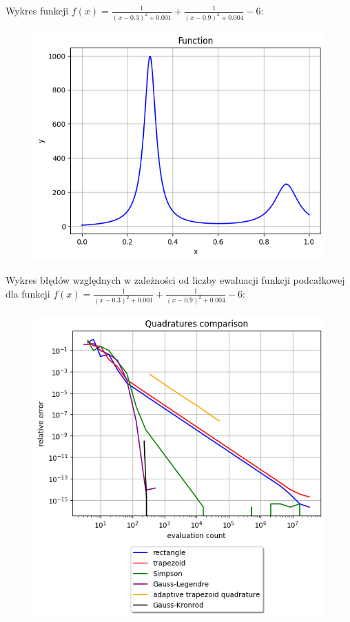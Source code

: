 \documentclass{article}
\begin{document}
Wykres funkcji $f(x) = \frac{1}{(x-0.3)^2 + 0.001} + \frac{1}{(x-0.9)^2 + 0.004} - 6$:
\begin{figure}[H]
  \includegraphics[width=\linewidth]{figures/h.png}
\end{figure}

Wykres błędów względnych w zależności od liczby ewaluacji
funkcji podcałkowej dla funkcji \space
$f(x) = \frac{1}{(x-0.3)^2 + 0.001} + \frac{1}{(x-0.9)^2 + 0.004} - 6$:
\begin{figure}[H]
  \includegraphics[width=\linewidth]{figures/quad_h.png}
\end{figure}
\end{document}
